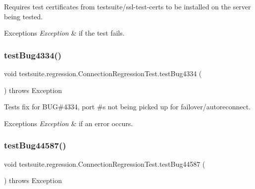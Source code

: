Requires test certificates from testsuite/ssl-\/test-\/certs to be installed on the server being tested.


\begin{DoxyExceptions}{Exceptions}
{\em Exception} & if the test fails. \\
\hline
\end{DoxyExceptions}
\mbox{\label{classtestsuite_1_1regression_1_1_connection_regression_test_a83abae1bb52b0bab9efe6949e40faecf}} 
\subsubsection{\texorpdfstring{test\+Bug4334()}{testBug4334()}}
{\footnotesize\ttfamily void testsuite.\+regression.\+Connection\+Regression\+Test.\+test\+Bug4334 (\begin{DoxyParamCaption}{ }\end{DoxyParamCaption}) throws Exception}

Tests fix for B\+UG\#4334, port \#\textquotesingle{}s not being picked up for failover/autoreconnect.


\begin{DoxyExceptions}{Exceptions}
{\em Exception} & if an error occurs. \\
\hline
\end{DoxyExceptions}
\mbox{\label{classtestsuite_1_1regression_1_1_connection_regression_test_af33f3215b2db8a83a5b3bb4079964dd3}} 
\subsubsection{\texorpdfstring{test\+Bug44587()}{testBug44587()}}
{\footnotesize\ttfamily void testsuite.\+regression.\+Connection\+Regression\+Test.\+test\+Bug44587 (\begin{DoxyParamCaption}{ }\end{DoxyParamCaption}) throws Exception}

